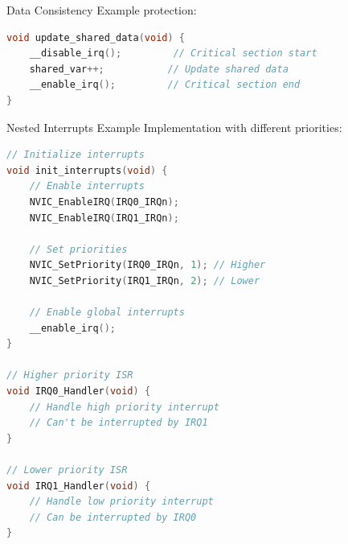 \begin{example2}{Data Consistency}
  Example protection:
\begin{lstlisting}[language=C, style=basesmol]
void update_shared_data(void) {
    __disable_irq();         // Critical section start
    shared_var++;           // Update shared data
    __enable_irq();         // Critical section end
}
\end{lstlisting}
\end{example2}

\begin{example2}{Nested Interrupts Example}
Implementation with different priorities:
\begin{lstlisting}[language=C, style=basesmol]
// Initialize interrupts
void init_interrupts(void) {
    // Enable interrupts
    NVIC_EnableIRQ(IRQ0_IRQn);
    NVIC_EnableIRQ(IRQ1_IRQn);
    
    // Set priorities
    NVIC_SetPriority(IRQ0_IRQn, 1); // Higher
    NVIC_SetPriority(IRQ1_IRQn, 2); // Lower
    
    // Enable global interrupts
    __enable_irq();
}

// Higher priority ISR
void IRQ0_Handler(void) {
    // Handle high priority interrupt
    // Can't be interrupted by IRQ1
}

// Lower priority ISR
void IRQ1_Handler(void) {
    // Handle low priority interrupt
    // Can be interrupted by IRQ0
}
\end{lstlisting}
\end{example2}









